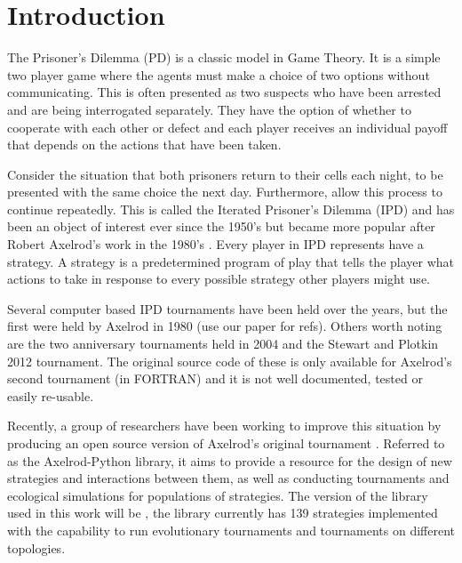 
\chapter{Introduction}\label{cha:introduction}

The Prisoner's Dilemma (PD) is a classic model in Game Theory.
It is a simple two player game where the agents must make a choice of two options without communicating.
This is often presented as two suspects who have been arrested and are being interrogated separately.
They have the option of whether to cooperate with each other or defect and each player receives an individual payoff that depends on the actions that have been taken.

Consider the situation that both prisoners return to their cells each night, to be presented with the same choice the next day.
Furthermore, allow this process to continue repeatedly.
This is called the Iterated Prisoner's Dilemma (IPD) and has been an object of interest ever since the 1950's but became more popular after Robert Axelrod's work in the 1980's \cite{Axelrod2016}.
Every player in IPD represents have a strategy.
A strategy is a predetermined program of play that tells the player what actions to take in response to every possible strategy other players might use.

Several computer based IPD tournaments have been held over the years, but the
first were held by Axelrod in 1980 (use our paper for refs). %
Others worth noting are the two anniversary tournaments  held in 2004 and the Stewart and Plotkin 2012 tournament.
The original source code of these is only available for Axelrod's second tournament (in FORTRAN) and it is not well documented, tested or easily re-usable.

Recently, a group of researchers have been working to improve this situation by producing an open source version of Axelrod's original tournament \cite{Knight2016}.
Referred to as the Axelrod-Python library, it aims to provide a resource for the design of new strategies and interactions between them, as well as conducting tournaments and ecological simulations for populations of strategies.
The version of the library used in this work will be \cite{axelrodproject}, the library currently has 139 strategies implemented with the capability to run evolutionary tournaments and tournaments on different topologies.

